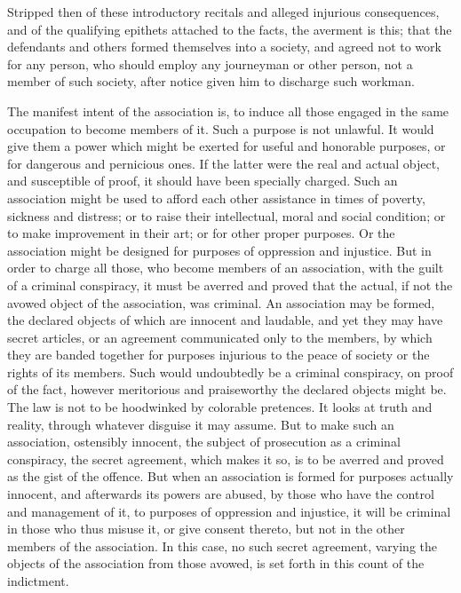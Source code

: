 \documentclass[
  letterpaper,
  11pt,
  DIV=9,
  openright]{scrbook}
\begin{document}
Stripped then of these introductory recitals and alleged injurious
consequences, and of the qualifying epithets attached to the facts, the
averment is this; that the defendants and others formed themselves into
a society, and agreed not to work for any person, who should employ any
journeyman or other person, not a member of such society, after notice
given him to discharge such workman.

The manifest intent of the association is, to induce all those engaged
in the same occupation to become members of it. Such a purpose is not
unlawful. It would give them a power which might be exerted for useful
and honorable purposes, or for dangerous and pernicious ones. If the
latter were the real and actual object, and susceptible of proof, it
should have been specially charged. Such an association might be used to
afford each other assistance in times of poverty, sickness and distress;
or to raise their intellectual, moral and social condition; or to make
improvement in their art; or for other proper purposes. Or the
association might be designed for purposes of oppression and injustice.
But in order to charge all those, who become members of an association,
with the guilt of a criminal conspiracy, it must be averred and proved
that the actual, if not the avowed object of the association, was
criminal. An association may be formed, the declared objects of which
are innocent and laudable, and yet they may have secret articles, or an
agreement communicated only to the members, by which they are banded
together for purposes injurious to the peace of society or the rights of
its members. Such would undoubtedly be a criminal conspiracy, on proof
of the fact, however meritorious and praiseworthy the declared objects
might be. The law is not to be hoodwinked by colorable pretences. It
looks at truth and reality, through whatever disguise it may assume. But
to make such an association, ostensibly innocent, the subject of
prosecution as a criminal conspiracy, the secret agreement, which makes
it so, is to be averred and proved as the gist of the offence. But when
an association is formed for purposes actually innocent, and afterwards
its powers are abused, by those who have the control and management of
it, to purposes of oppression and injustice, it will be criminal in
those who thus misuse it, or give consent thereto, but not in the other
members of the association. In this case, no such secret agreement,
varying the objects of the association from those avowed, is set forth
in this count of the indictment.
\end{document}
